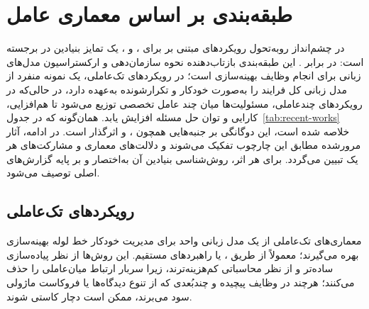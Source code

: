 \section{طبقه‌بندی بر اساس معماری عامل}
در چشم‌انداز رو‌به‌تحول رویکردهای مبتنی بر  برای ،  و ، یک تمایز بنیادین در  برجسته است:  در برابر . این طبقه‌بندی بازتاب‌دهنده نحوه سازمان‌دهی و ارکستراسیون مدل‌های زبانی برای انجام وظایف بهینه‌سازی است؛ در رویکردهای تک‌عاملی، یک نمونه منفرد از مدل زبانی کل فرایند را به‌صورت خودکار و تکرارشونده به‌عهده دارد، در حالی‌که در رویکردهای چندعاملی، مسئولیت‌ها میان چند عامل تخصصی توزیع می‌شود تا هم‌افزایی، کارایی و توان حل مسئله افزایش یابد. همان‌گونه که در جدول~\ref{tab:recent-works} خلاصه شده است، این دوگانگی بر جنبه‌هایی همچون ،  و  اثرگذار است. در ادامه، آثار مرورشده مطابق این چارچوب تفکیک می‌شوند و دلالت‌های معماری و مشارکت‌های هر یک تبیین می‌گردد. برای هر اثر، روش‌شناسی بنیادین آن به‌اختصار و بر پایه گزارش‌های اصلی توصیف می‌شود.

\subsection{رویکردهای تک‌عاملی}
معماری‌های تک‌عاملی از یک مدل زبانی واحد برای مدیریت خودکار خط لوله بهینه‌سازی بهره می‌گیرند؛ معمولاً از طریق ،  یا راهبردهای  مستقیم. این روش‌ها از نظر پیاده‌سازی ساده‌تر و از نظر محاسباتی کم‌هزینه‌ترند، زیرا سربار ارتباط میان‌عاملی را حذف می‌کنند؛ هرچند در وظایف پیچیده و چندبُعدی که از تنوع دیدگاه‌ها یا فروکاست ماژولی سود می‌برند، ممکن است دچار کاستی شوند.

